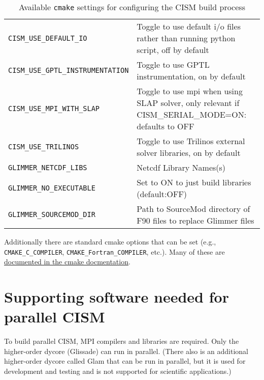 \begin{table}
\begin{tabular}{ l | p{8cm} }
\texttt{CISM\_USE\_DEFAULT\_IO} &  Toggle to use default i/o files rather than running python script, off by default \\

\texttt{CISM\_USE\_GPTL\_INSTRUMENTATION} & Toggle to use GPTL instrumentation, on by default \\

\texttt{CISM\_USE\_MPI\_WITH\_SLAP} & Toggle to use mpi when using SLAP solver, only relevant if CISM\_SERIAL\_MODE=ON: defaults to OFF \\

\texttt{CISM\_USE\_TRILINOS} & Toggle to use Trilinos external solver libraries, on by default \\

\texttt{GLIMMER\_NETCDF\_LIBS} &  Netcdf Library Names(s) \\

\texttt{GLIMMER\_NO\_EXECUTABLE} & Set to  ON  to just build libraries (default:OFF) \\

\texttt{GLIMMER\_SOURCEMOD\_DIR} &  Path to SourceMod directory of F90 files to replace Glimmer files \\

\hline
\end{tabular}
  \caption{Available \texttt{cmake} settings for configuring the CISM build process}
  \label{cmake-options}
\end{table}

Additionally there are standard cmake options that can be set (e.g., \texttt{CMAKE\_C\_COMPILER}, \texttt{CMAKE\_Fortran\_COMPILER}, etc.).  Many of these are \href{http://www.cmake.org/Wiki/CMake_Useful_Variables}{documented in the cmake docmentation}.




\section{Supporting software needed for parallel CISM}
To build parallel CISM, MPI compilers and libraries are required.  
Only the higher-order dycore (Glissade) can run in parallel.  (There also is an
additional higher-order dycore called Glam that can be run in parallel, but it is used
for development and testing and is not supported for scientific applications.)

